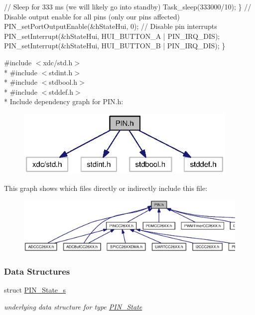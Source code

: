 \begin{DoxyCode}
        \textcolor{comment}{// Sleep for 333 ms (we will likely go into standby)}
        Task\_sleep(333000/10);
    \}
    \textcolor{comment}{// Disable output enable for all pins (only our pins affected)}
    PIN_setPortOutputEnable(&hStateHui, 0);
    \textcolor{comment}{// Disable pin interrupts}
    PIN_setInterrupt(&hStateHui, HUI\_BUTTON\_A | PIN_IRQ_DIS);
    PIN_setInterrupt(&hStateHui, HUI\_BUTTON\_B | PIN_IRQ_DIS);
\}
\end{DoxyCode}
 {\ttfamily \#include $<$xdc/std.\+h$>$}\\*
{\ttfamily \#include $<$stdint.\+h$>$}\\*
{\ttfamily \#include $<$stdbool.\+h$>$}\\*
{\ttfamily \#include $<$stddef.\+h$>$}\\*
Include dependency graph for P\+I\+N.\+h\+:
\nopagebreak
\begin{figure}[H]
\begin{center}
\leavevmode
\includegraphics[width=303pt]{_p_i_n_8h__incl}
\end{center}
\end{figure}
This graph shows which files directly or indirectly include this file\+:
\nopagebreak
\begin{figure}[H]
\begin{center}
\leavevmode
\includegraphics[width=350pt]{_p_i_n_8h__dep__incl}
\end{center}
\end{figure}
\subsubsection*{Data Structures}
\begin{DoxyCompactItemize}
\item 
struct \hyperlink{struct_p_i_n___state__s}{P\+I\+N\+\_\+\+State\+\_\+s}
\begin{DoxyCompactList}\small\item\em underlying data structure for type \hyperlink{_p_i_n_8h_a36ef69d50df6baa6973482669c24a522}{P\+I\+N\+\_\+\+State} \end{DoxyCompactList}\end{DoxyCompactItemize}
